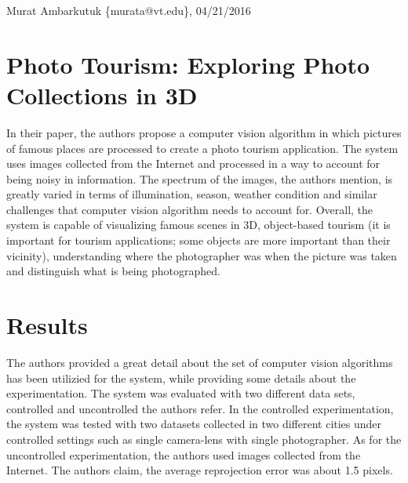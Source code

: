 \documentclass[11pt]{article}
\begin{document}
\thispagestyle{empty}
\begin{flushright}
	\small{Murat Ambarkutuk \{murata@vt.edu\}, 04/21/2016}
\end{flushright}
\section*{Photo Tourism: Exploring Photo Collections in 3D}
In their paper, the authors propose a computer vision algorithm in which pictures of famous places are processed to create a photo tourism application.
The system uses images collected from the Internet and processed in a way to account for being noisy in information.
The spectrum of the images, the authors mention, is greatly varied in terms of illumination, season, weather condition and similar challenges that computer vision algorithm needs to account for.
Overall, the system is capable of visualizing famous scenes in 3D, object-based tourism (it is important for tourism applications; some objects are more important than their vicinity), understanding where the photographer was when the picture was taken and distinguish what is being photographed.



\section*{Results}
The authors provided a great detail about the set of computer vision algorithms has been utilizied for the system, while providing some details about the experimentation.
The system was evaluated with two different data sets, controlled and uncontrolled the authors refer.
In the controlled experimentation, the system was tested with two datasets collected in two different cities under controlled settings such as single camera-lens with single photographer.
As for the uncontrolled experimentation, the authors used images collected from the Internet.
The authors claim, the average reprojection error was about 1.5 pixels.
\end{document}

